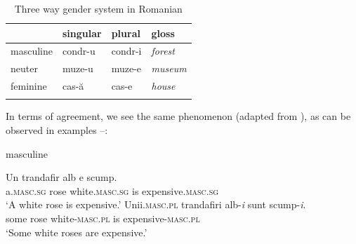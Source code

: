 \begin{table}
  \centering
  \begin{tabular}{llll}
    \lsptoprule
              & singular                   & plural                    & gloss           \\
    \midrule
    masculine & \cellcolor{gray!25}condr-u & condr-i                    & \textit{forest} \\
    neuter    & \cellcolor{gray!25}muze-u  & \cellcolor{gray!25}muze-e & \textit{museum} \\
    feminine  & cas-ă                      & \cellcolor{gray!25}cas-e  & \textit{house}  \\
    \lspbottomrule
  \end{tabular}
  \caption{Three way gender system in Romanian}\label{tab:gender-rom}
\end{table}

In terms of agreement, we see the same phenomenon (adapted from \citealt{Farkas.1990}), as can be observed in examples --:

\largerpage[2]
\begin{exe}
    \ex \label{romanian-masc-exe} masculine
    \begin{xlist}
        \ex 
        \gll Un trandafir alb e scump.\\
        a.\textsc{masc.sg} rose white.\textsc{masc.sg} is expensive.\textsc{masc.sg}\\
        \glt `A white rose is expensive.'
        \ex 
        \gll Unii.\textsc{masc.pl} trandafiri alb-\textit{i} sunt scump-\textit{i}.\\
        some rose white-\textsc{masc.pl} is expensive-\textsc{masc.pl}\\
        \glt `Some white roses are expensive.'
    \end{xlist}
    \end{exe}
    
